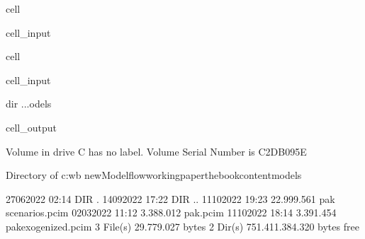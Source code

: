 \documentclass[letterpaper,10pt,english]{jupyterBook}
\begin{document}
\begin{sphinxuseclass}{cell}\begin{sphinxVerbatimInput}

\begin{sphinxuseclass}{cell_input}
\begin{sphinxVerbatim}[commandchars=\\\{\}]
\end{sphinxVerbatim}

\end{sphinxuseclass}\end{sphinxVerbatimInput}

\end{sphinxuseclass}
\begin{sphinxuseclass}{cell}\begin{sphinxVerbatimInput}

\begin{sphinxuseclass}{cell_input}
\begin{sphinxVerbatim}[commandchars=\\\{\}]
dir ...odels
\end{sphinxVerbatim}

\end{sphinxuseclass}\end{sphinxVerbatimInput}
\begin{sphinxVerbatimOutput}

\begin{sphinxuseclass}{cell_output}
\begin{sphinxVerbatim}[commandchars=\\\{\}]
 Volume in drive C has no label.
 Volume Serial Number is C2DB\PYGZhy{}095E

 Directory of c:\PYGZbs{}wb new\PYGZbs{}Modelflow\PYGZbs{}working\PYGZus{}paper\PYGZbs{}thebook\PYGZbs{}content\PYGZbs{}models

27\PYGZhy{}06\PYGZhy{}2022  02:14    \PYGZlt{}DIR\PYGZgt{}          .
14\PYGZhy{}09\PYGZhy{}2022  17:22    \PYGZlt{}DIR\PYGZgt{}          ..
11\PYGZhy{}10\PYGZhy{}2022  19:23        22.999.561 pak scenarios.pcim
02\PYGZhy{}03\PYGZhy{}2022  11:12         3.388.012 pak.pcim
11\PYGZhy{}10\PYGZhy{}2022  18:14         3.391.454 pak\PYGZus{}exogenized.pcim
               3 File(s)     29.779.027 bytes
               2 Dir(s)  751.411.384.320 bytes free
\end{sphinxVerbatim}

\end{sphinxuseclass}\end{sphinxVerbatimOutput}

\end{sphinxuseclass}
\end{document}
